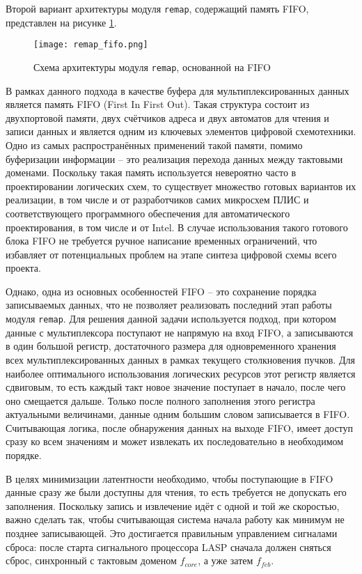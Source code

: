 Второй вариант архитектуры модуля \texttt{remap}, содержащий память FIFO, представлен на рисунке \ref{fig:remap_fifo}.\par
\begin{figure}[ht]
    \centering
    \texttt{[image: remap\_fifo.png]}
    \caption{Схема архитектуры модуля \texttt{remap}, основанной на FIFO}
    \label{fig:remap_fifo}
\end{figure}\par
В рамках данного подхода в качестве буфера для мультиплексированных данных является память FIFO (First In First Out). Такая структура состоит из двухпортовой памяти, двух счётчиков адреса и двух автоматов для чтения и записи данных и является одним из ключевых элементов цифровой схемотехники. Одно из самых распространённых применений такой памяти, помимо буферизации информации -- это реализация перехода данных между тактовыми доменами. Поскольку такая память используется невероятно часто в проектировании логических схем, то существует множество готовых вариантов их реализации, в том числе и от разработчиков самих микросхем ПЛИС и соответствующего программного обеспечения для автоматического проектирования, в том числе и от Intel. В случае использования такого готового блока FIFO не требуется ручное написание временных ограничений, что избавляет от потенциальных проблем на этапе синтеза цифровой схемы всего проекта.\par
Однако, одна из основных особенностей FIFO -- это сохранение порядка записываемых данных, что не позволяет реализовать последний этап работы модуля \texttt{remap}. Для решения данной задачи используется подход, при котором данные с мультиплексора поступают не напрямую на вход FIFO, а записываются в один большой регистр, достаточного размера для одновременного хранения всех мультиплексированных данных в рамках текущего столкновения пучков. Для наиболее оптимального использования логических ресурсов этот регистр является сдвиговым, то есть каждый такт новое значение поступает в начало, после чего оно смещается дальше. Только после полного заполнения этого регистра актуальными величинами, данные одним большим словом записывается в FIFO. Считывающая логика, после обнаружения данных на выходе FIFO, имеет доступ сразу ко всем значениям и может извлекать их последовательно в необходимом порядке.\par
В целях минимизации латентности необходимо, чтобы поступающие в FIFO данные сразу же были доступны для чтения, то есть требуется не допускать его заполнения. Поскольку запись и извлечение идёт с одной и той же скоростью, важно сделать так, чтобы считывающая система начала работу как минимум не позднее записывающей. Это достигается правильным управлением сигналами сброса: после старта сигнального процессора LASP сначала должен сняться сброс, синхронный с тактовым доменом $f_{core}$, а уже затем $f_{feb}$.\par
